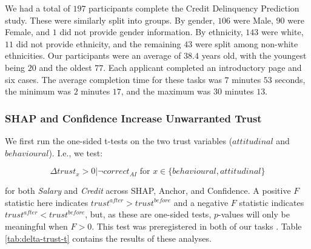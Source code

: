 We had a total of $197$ participants complete the Credit Delinquency Prediction study. These were similarly split into groups. By gender, $106$ were Male, $90$ were Female, and $1$ did not provide gender information. By ethnicity, $143$ were white, $11$ did not provide ethnicity, and the remaining $43$ were split among non-white ethnicities. Our participants were an average of $38.4$ years old, with the youngest being $20$ and the oldest $77$. Each applicant completed an introductory page and six cases. The average completion time for these tasks was $7$ minutes $53$ seconds, the minimum was $2$ minutes $17$, and the maximum was $30$ minutes $13$.

\subsubsection{SHAP and Confidence Increase Unwarranted Trust}
We first run the one-sided t-tests on the two trust variables ($attitudinal$ and $behavioural$). I.e., we test:

\begin{equation}
    \Delta trust_{x} > 0 | \neg correct_{AI} \text{ for } x \in \{behavioural, attitudinal\}
\end{equation}

\noindent for both \emph{Salary} and \emph{Credit} across SHAP, Anchor, and Confidence. A positive $F$ statistic here indicates $trust^{after} > trust^{before}$ and a negative $F$ statistic indicates $trust^{after} < trust^{before}$, but, as these are one-sided tests, $p$-values will only be meaningful when $F > 0$. This test was preregistered in both of our tasks \cite{natarajan_binns_2022}. Table \ref{tab:delta-trust-t} contains the results of these analyses.  

